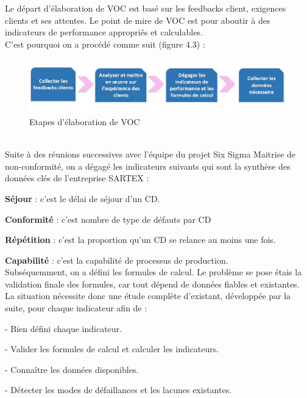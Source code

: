 \documentclass[12pt, a4paper]{thesis}
\begin{document}
Le départ d'élaboration de VOC est basé sur les feedbacks client, exigences clients et ses attentes. Le point de mire de VOC est pour aboutir à des indicateurs de performance appropriés et calculables.\\
C'est pourquoi on a procédé comme suit (figure 4.3) :
\begin{figure}[!h]
\begin{center}
     \includegraphics[scale=0.7]{vo.JPG}
     \caption{Etapes d'élaboration de VOC}
\end{center}
\end{figure}\\

Suite à des réunions successives avec l'équipe du projet Six Sigma Maitrise de non-conformité, on a dégagé les indicateurs suivants qui sont la synthèse des données clés de l’entreprise SARTEX :
\item \textbf{Séjour} : c’est le délai de séjour d’un CD.
\item \textbf{Conformité} : c’est nombre de type de défauts par CD 
\item \textbf{Répétition} : c'est la proportion qu'un CD se relance au moins une fois.
\item \textbf{Capabilité} : c’est la capabilité de processus de production.\\

Subséquemment, on a défini les formules de calcul. Le problème se pose étais la validation finale des formules, car tout dépend de données fiables et existantes.\\
La situation nécessite donc une étude complète d’existant, développée par la suite, pour chaque indicateur afin de : 
\item - Bien défini chaque indicateur.
\item - Valider les formules de calcul et calculer les indicateurs.
\item - Connaître les données disponibles.
\item - Détecter les modes de défaillances et les lacunes existantes.\\
\end{document}
